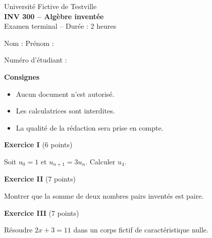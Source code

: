 \documentclass[11pt,a4paper]{article}
\begin{document}
\thispagestyle{empty}
\begin{center}
{\large Université Fictive de Testville}\\[8pt]
{\Large\textbf{INV 300 -- Algèbre inventée}}\\[4pt]
Examen terminal -- Durée : 2 heures
\end{center}
\vspace{8pt}
\noindent Nom : \makebox[0.4\textwidth]{\dotfill}\hfill Prénom : \makebox[0.3\textwidth]{\dotfill}\par\vspace{6pt}
\noindent Numéro d'étudiant : \makebox[0.3\textwidth]{\dotfill}\par\vspace{10pt}
\noindent\textbf{Consignes}
\begin{itemize}\setlength{\itemsep}{1pt}
\item Aucun document n'est autorisé.
\item Les calculatrices sont interdites.
\item La qualité de la rédaction sera prise en compte.
\end{itemize}
\vspace{10pt}
\noindent\textbf{Exercice I} (6 points)\par\smallskip
Soit $u_0 = 1$ et $u_{n+1} = 3u_n$. Calculer $u_4$.\par\vspace{3cm}
\noindent\textbf{Exercice II} (7 points)\par\smallskip
Montrer que la somme de deux nombres pairs inventés est paire.\par\vspace{3cm}
\clearpage
\noindent\textbf{Exercice III} (7 points)\par\smallskip
Résoudre $2x + 3 = 11$ dans un corps fictif de caractéristique nulle.\par\vspace{3cm}
\end{document}
